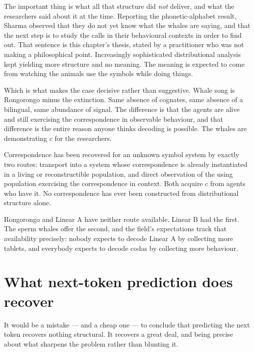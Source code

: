 The important thing is what all that structure did \emph{not}
deliver, and what the researchers said about it at the time.
Reporting the phonetic-alphabet result, Sharma observed that they
do not yet know what the whales are saying, and that the next step
is to study the calls in their behavioural contexts in order to
find out.
That sentence is this chapter's thesis, stated by a practitioner
who was not making a philosophical point.
Increasingly sophisticated distributional analysis kept yielding
more structure and no meaning.
The meaning is expected to come from watching the animals use the
symbols while doing things.

Which is what makes the case decisive rather than suggestive.
Whale song is Rongorongo minus the extinction.
Same absence of cognates, same absence of a bilingual, same
abundance of signal.
The difference is that the agents are alive and still exercising
the correspondence in observable behaviour, and that difference is
the entire reason anyone thinks decoding is possible.
The whales are demonstrating $c$ for the researchers.

\begin{observation}
\label{obs:transport}
Correspondence has been recovered for an unknown symbol system by
exactly two routes: transport into a system whose correspondence is
already instantiated in a living or reconstructible population, and
direct observation of the using population exercising the
correspondence in context.
Both acquire $c$ from agents who have it.
No correspondence has ever been constructed from distributional
structure alone.
\end{observation}

\noindent
Rongorongo and Linear A have neither route available.
Linear B had the first.
The sperm whales offer the second, and the field's expectations
track that availability precisely: nobody expects to decode Linear
A by collecting more tablets, and everybody expects to decode codas
by collecting more behaviour.

\section{What next-token prediction does recover}
\label{sec:recovers}

It would be a mistake --- and a cheap one --- to conclude that
predicting the next token recovers nothing structural.
It recovers a great deal, and being precise about what sharpens the
problem rather than blunting it.

